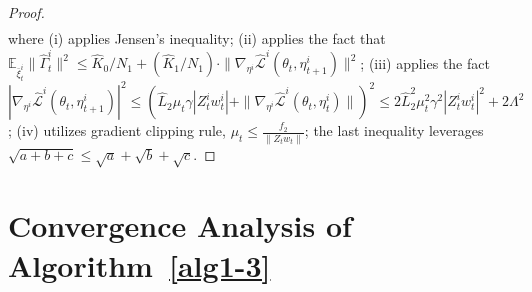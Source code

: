 \documentclass[twoside]{article} %
\theoremstyle{plain}
\theoremstyle{definition}
\theoremstyle{remark}
\newcommand{\HGamma}{\hat{\Gamma}}
\newcommand{\HUpsilon}{\hat{\Upsilon}}
\newcommand{\hL}{\hat{L}}
\newcommand{\fhL}{\hat{\mathcal{L}}}
\begin{document}
\begin{proof}
\begin{align}
        \label{eq: inner product bound thm 2}
    \end{align}
    where (i) applies Jensen's inequality; (ii) applies the fact that $\mathbb{E}_{\bar{\xi}_{t}^i}\|\HGamma_{t}^i\|^2\leq \hat{K}_0/N_1+(\hat{K}_1/N_1)\cdot\|\nabla_{\eta^i}\fhL^i(\theta_t,\eta^{i}_{t+1})\|^2$; (iii) applies the fact $|\nabla_{\eta^i}\fhL^i(\theta_t,\eta^{i}_{t+1})|^2\leq (\hL_2\mu_t\gamma|Z_t^iw_t^i|+\|\nabla_{\eta^i}\fhL^i(\theta_t, \eta_{t}^i)\|)^2\leq 2\hL_2^2\mu_t^2\gamma^2 |Z_t^iw_t^i|^2+2\Lambda^2$;
    (iv) utilizes gradient clipping rule, $\mu_t\leq \frac{f_2}{\|Z_tw_t\|}$; the last inequality leverages $\sqrt{a+b+c}\leq \sqrt{a}+\sqrt{b}+\sqrt{c}$.
\end{proof}
    

\section{Convergence Analysis of Algorithm~\ref{alg1-3}}
\end{document}
